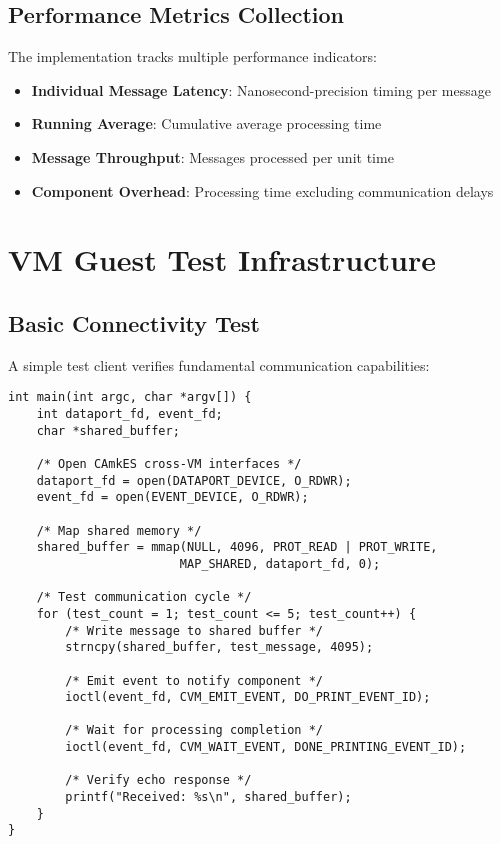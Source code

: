 \documentclass[12pt,a4paper]{article}
\begin{document}
\subsection{Performance Metrics Collection}

The implementation tracks multiple performance indicators:

\begin{itemize}
\item \textbf{Individual Message Latency}: Nanosecond-precision timing per message
\item \textbf{Running Average}: Cumulative average processing time
\item \textbf{Message Throughput}: Messages processed per unit time
\item \textbf{Component Overhead}: Processing time excluding communication delays
\end{itemize}

\section{VM Guest Test Infrastructure}

\subsection{Basic Connectivity Test}

A simple test client verifies fundamental communication capabilities:

\begin{lstlisting}[style=camkes, caption=Basic connectivity test structure]
int main(int argc, char *argv[]) {
    int dataport_fd, event_fd;
    char *shared_buffer;
    
    /* Open CAmkES cross-VM interfaces */
    dataport_fd = open(DATAPORT_DEVICE, O_RDWR);
    event_fd = open(EVENT_DEVICE, O_RDWR);
    
    /* Map shared memory */
    shared_buffer = mmap(NULL, 4096, PROT_READ | PROT_WRITE, 
                        MAP_SHARED, dataport_fd, 0);
    
    /* Test communication cycle */
    for (test_count = 1; test_count <= 5; test_count++) {
        /* Write message to shared buffer */
        strncpy(shared_buffer, test_message, 4095);
        
        /* Emit event to notify component */
        ioctl(event_fd, CVM_EMIT_EVENT, DO_PRINT_EVENT_ID);
        
        /* Wait for processing completion */
        ioctl(event_fd, CVM_WAIT_EVENT, DONE_PRINTING_EVENT_ID);
        
        /* Verify echo response */
        printf("Received: %s\n", shared_buffer);
    }
}
\end{lstlisting}
\end{document}
